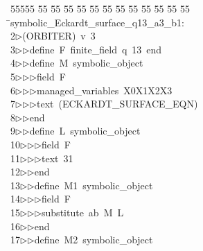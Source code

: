 %
%
\begin{tabbing}
55555 \= 55 \= 55 \= 55 \= 55 \= 55 \= 55 \= 55 \= 55 \= 55 \= 55 \= 55 \= 55 \= \>symbolic\_Eckardt\_surface\_q13\_a3\_b1:\\[0pt]
2\>$\triangleright$\>(ORBITER)\ v\ 3\ \\[0pt]
3\>$\triangleright$\>$\triangleright$\>define\ F\ finite\_field\ q\ 13\ end\ \\[0pt]
4\>$\triangleright$\>$\triangleright$\>define\ M\ symbolic\_object\ \\[0pt]
5\>$\triangleright$\>$\triangleright$\>$\triangleright$\>field\ F\ \\[0pt]
6\>$\triangleright$\>$\triangleright$\>$\triangleright$\>managed\_variables\ X0X1X2X3\ \\[0pt]
7\>$\triangleright$\>$\triangleright$\>$\triangleright$\>text\ (ECKARDT\_SURFACE\_EQN)\ \\[0pt]
8\>$\triangleright$\>$\triangleright$\>end\ \\[0pt]
9\>$\triangleright$\>$\triangleright$\>define\ L\ symbolic\_object\ \\[0pt]
10\>$\triangleright$\>$\triangleright$\>$\triangleright$\>field\ F\ \\[0pt]
11\>$\triangleright$\>$\triangleright$\>$\triangleright$\>text\ 31\ \\[0pt]
12\>$\triangleright$\>$\triangleright$\>end\ \\[0pt]
13\>$\triangleright$\>$\triangleright$\>define\ M1\ symbolic\_object\ \\[0pt]
14\>$\triangleright$\>$\triangleright$\>$\triangleright$\>field\ F\ \\[0pt]
15\>$\triangleright$\>$\triangleright$\>$\triangleright$\>substitute\ ab\ M\ L\ \\[0pt]
16\>$\triangleright$\>$\triangleright$\>end\ \\[0pt]
17\>$\triangleright$\>$\triangleright$\>define\ M2\ symbolic\_object\ \\[0pt]

\end{tabbing}
